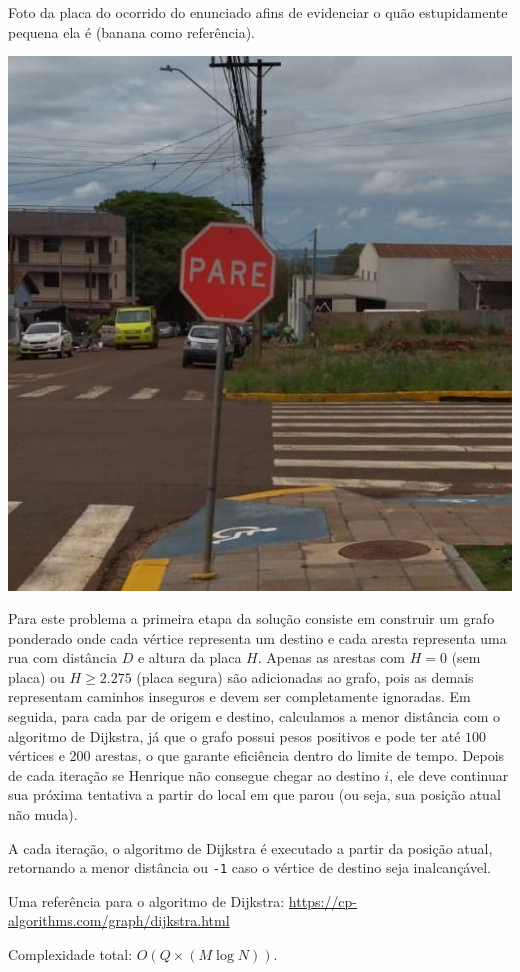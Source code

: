 Foto da placa do ocorrido do enunciado afins de evidenciar o quão estupidamente pequena ela é (banana como referência).

\includegraphics[scale=0.30]{placa.png}

Para este problema a primeira etapa da solução consiste em construir um grafo ponderado onde cada vértice representa um destino e cada aresta representa uma rua com distância $D$ e altura da placa $H$. Apenas as arestas com $H = 0$ (sem placa) ou $H \ge 2.275$ (placa segura) são adicionadas ao grafo, pois as demais representam caminhos inseguros e devem ser completamente ignoradas.
Em seguida, para cada par de origem e destino, calculamos a menor distância com o algoritmo de Dijkstra, já que o grafo possui pesos positivos e pode ter até $100$ vértices e $200$ arestas, o que garante eficiência dentro do limite de tempo.
Depois de cada iteração se Henrique não consegue chegar ao destino $i$, ele deve continuar sua próxima tentativa a partir do local em que parou (ou seja, sua posição atual não muda).

A cada iteração, o algoritmo de Dijkstra é executado a partir da posição atual, retornando a menor distância ou \texttt{-1} caso o vértice de destino seja inalcançável.

Uma referência para o algoritmo de Dijkstra: \url{https://cp-algorithms.com/graph/dijkstra.html}

Complexidade total: \(O(Q \times (M \log N))\).
